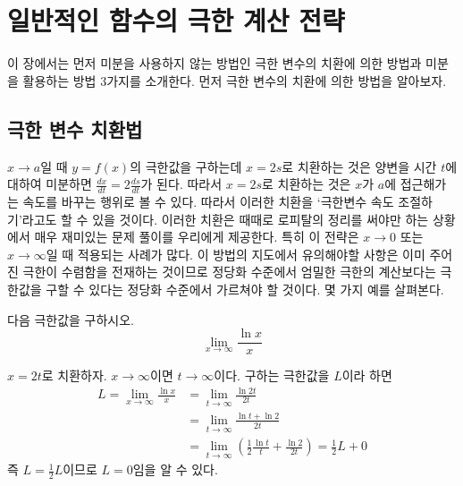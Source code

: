 \documentclass[11pt, a4paper]{book}
\begin{document}
	\chapter{\Huge 일반적인 함수의 극한 계산 전략}
		이 장에서는 먼저 미분을 사용하지 않는 방법인 극한 변수의 치환에 의한 방법과 미분을 활용하는 방법 3가지를 소개한다. 먼저 극한 변수의 치환에 의한 방법을 알아보자.
	
\section{극한 변수 치환법}
	 $x\to a$일 때 $y=f(x)$의 극한값을 구하는데 $x= 2s$로 치환하는 것은 양변을 시간 $t$에 대하여 미분하면 $\frac{dx}{dt}=2\frac{ds}{dt}$가 된다. 따라서 $x= 2s$로 치환하는 것은 $x$가 $a$에 접근해가는 속도를 바꾸는 행위로 볼 수 있다. 따라서 이러한 치환을 ‘극한변수 속도 조절하기’라고도 할 수 있을 것이다. 이러한 치환은 때때로 로피탈의 정리를 써야만 하는 상황에서 매우 재미있는 문제 풀이를 우리에게 제공한다. 특히 이 전략은 $x\to 0$ 또는 $x\to\infty$일 때 적용되는 사례가 많다. 이 방법의 지도에서 유의해야할 사항은 이미 주어진 극한이 수렴함을 전재하는 것이므로 정당화 수준에서 엄밀한 극한의 계산보다는 극한값을 구할 수 있다는 정당화 수준에서 가르쳐야 할 것이다. 몇 가지 예를 살펴본다.
	
	\vspace{1em}
	\begin{example}
	다음 극한값을 구하시오.
\begin{equation*}
	\displaystyle\lim_{x\to\infty}\frac{\ln x}{x}
\end{equation*}
\begin{solution}
	$x = 2t$로 치환하자. $x\to\infty$이면 $t\to\infty$이다. 구하는 극한값을 $L$이라 하면
\begin{align*}
L =\displaystyle\lim_{x\to\infty}\frac{\ln x}{x}
& =\displaystyle\lim_{t\to\infty}\frac{\ln 2t}{2t}\\
& =\displaystyle\lim_{t\to\infty}\frac{\ln t +\ln 2}{2t}\\
& =\displaystyle\lim_{t\to\infty}\left(\frac{1}{2}\frac{\ln t}{t}+\frac{\ln 2}{2t}\right)=\frac{1}{2}L +0
\end{align*}
즉 $L =\frac{1}{2}L$이므로 $L=0$임을 알 수 있다.
\end{solution}
\end{example}
\end{document}
